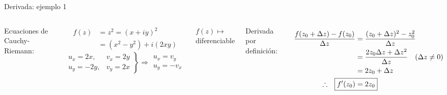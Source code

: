 \documentclass[9pt, aspectratio=169]{beamer}
\begin{document}
\begin{frame}{Derivada: ejemplo 1}
	\begin{columns}[t]
		Ecuaciones de Cauchy-Riemann:

		\begin{align*}
			f(z) & = z^2 = (x + i y)^2     \\
			     & = (x^2 - y^2) + i (2xy)
		\end{align*}
		\[\left.{ \begin{array}{ll}
				u_x = 2 x, & v_x = 2 y \\
				u_y = -2y, & v_y = 2 x
			\end{array}}  \right\}
			\Rightarrow \begin{array}{l}
				u_x = v_y \\
				u_y = -v_x
			\end{array}
		\]
		\begin{center}
			$f(z) \mapsto $ \alert{diferenciable}
		\end{center}
		\pause

		Derivada por definición:

		\begin{align*}
			\frac{f(z_0 + \Delta z) - f(z_0)}{\Delta z} & = \frac{(z_0 + \Delta z)^2 - z_0^2}{\Delta z}                          \\
			                                            & = \frac{2 z_0 \Delta z + \Delta z^2}{\Delta z} \quad (\Delta z \neq 0) \\
			                                            & = 2 z_0 + \Delta z                                                     \\
			\therefore \hspace{1em} \Aboxed{ f'(z_0)    & = 2 z_0 }
		\end{align*}
	\end{columns}
\end{frame}
\end{document}
